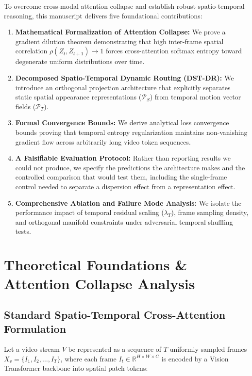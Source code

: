\documentclass[10pt,journal,compsoc,twocolumn]{IEEEtran}
\begin{document}
To overcome cross-modal attention collapse and establish robust spatio-temporal reasoning, this manuscript delivers five foundational contributions:
\begin{enumerate}
  \item \textbf{Mathematical Formalization of Attention Collapse:} We prove a gradient dilution theorem demonstrating that high inter-frame spatial correlation $\rho(Z_t, Z_{t+1}) \to 1$ forces cross-attention softmax entropy toward degenerate uniform distributions over time.
  \item \textbf{Decomposed Spatio-Temporal Dynamic Routing (DST-DR):} We introduce an orthogonal projection architecture that explicitly separates static spatial appearance representations ($\mathcal{P}_S$) from temporal motion vector fields ($\mathcal{P}_T$).
  \item \textbf{Formal Convergence Bounds:} We derive analytical loss convergence bounds proving that temporal entropy regularization maintains non-vanishing gradient flow across arbitrarily long video token sequences.
  \item \textbf{A Falsifiable Evaluation Protocol:} Rather than reporting results we could not produce, we specify the predictions the architecture makes and the controlled comparison that would test them, including the single-frame control needed to separate a dispersion effect from a representation effect.
  \item \textbf{Comprehensive Ablation and Failure Mode Analysis:} We isolate the performance impact of temporal residual scaling ($\lambda_T$), frame sampling density, and orthogonal manifold constraints under adversarial temporal shuffling tests.
\end{enumerate}




\section{Theoretical Foundations \& Attention Collapse Analysis}



\subsection{Standard Spatio-Temporal Cross-Attention Formulation}


Let a video stream $V$ be represented as a sequence of $T$ uniformly sampled frames $X_v = \{I_1, I_2, \ldots, I_T\}$, where each frame $I_t \in \mathbb{R}^{H \times W \times C}$ is encoded by a Vision Transformer backbone into spatial patch tokens:
\end{document}
